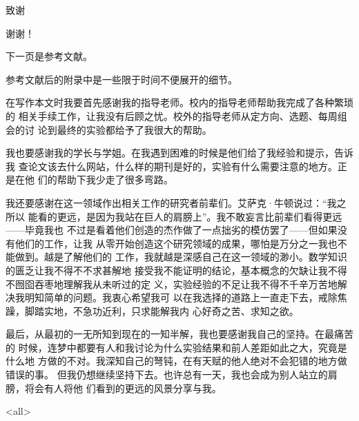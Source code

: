 \documentclass[../main]{subfiles}
\begin{document}
\mode*

\begin{acknowledgement}
  \begin{frame}{致谢}
    \begin{center}
      \LARGE 谢谢！
    \end{center}
    下一页是参考文献。

    参考文献后的附录中是一些限于时间不便展开的细节。
  \end{frame}

  在写作本文时我要首先感谢我的指导老师。校内的指导老师帮助我完成了各种繁琐的
  相关手续工作，让我没有后顾之忧。校外的指导老师从定方向、选题、每周组会的讨
  论到最终的实验都给予了我很大的帮助。

  我也要感谢我的学长与学姐。在我遇到困难的时候是他们给了我经验和提示，告诉我
  查论文该去什么网站，什么样的期刊是好的，实验有什么需要注意的地方。正是在他
  们的帮助下我少走了很多弯路。

  我还要感谢在这一领域作出相关工作的研究者前辈们。艾萨克·牛顿说过：“我之所以
  能看的更远，是因为我站在巨人的肩膀上”。我不敢妄言比前辈们看得更远——毕竟我也
  不过是看着他们创造的杰作做了一点拙劣的模仿罢了——但如果没有他们的工作，让我
  从零开始创造这个研究领域的成果，哪怕是万分之一我也不能做到。越是了解他们的
  工作，我就越是深感自己在这一领域的渺小。数学知识的匮乏让我不得不不求甚解地
  接受我不能证明的结论，基本概念的欠缺让我不得不囫囵吞枣地理解我从未听过的定
  义，实验经验的不足让我不得不千辛万苦地解决我明知简单的问题。我衷心希望我可
  以在我选择的道路上一直走下去，戒除焦躁，脚踏实地，不急功近利，只求能解我内
  心好奇之苦、求知之欲。

  最后，从最初的一无所知到现在的一知半解，我也要感谢我自己的坚持。在最痛苦的
  时候，连梦中都要有人和我讨论为什么实验结果和前人差距如此之大，究竟是什么地
  方做的不对。我深知自己的弩钝，在有天赋的他人绝对不会犯错的地方做错误的事。
  但我仍想继续坚持下去。也许总有一天，我也会成为别人站立的肩膀，将会有人将他
  们看到的更远的风景分享与我。
\end{acknowledgement}

\mode<all>
\end{document}
